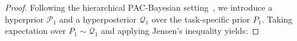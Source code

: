 \documentclass[letterpaper]{article} %
\begin{document}
\begin{proof}


Following the hierarchical PAC-Bayesian setting~\cite{pentinaPACBayesianBoundLifelong2014}, we introduce a hyperprior $\mathcal{P}_1$ and a hyperposterior $\mathcal{Q}_1$ over the task-specific prior $P_1$. Taking expectation over $P_1 \sim \mathcal{Q}_1$ and applying Jensen's inequality yields:


\end{proof}
\end{document}
